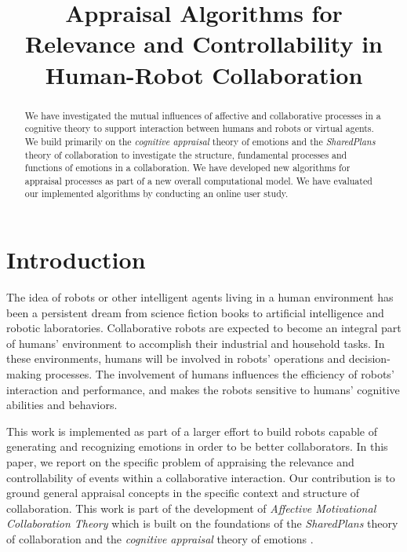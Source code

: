 \documentclass{article}
\title{Appraisal Algorithms for Relevance and Controllability in\\
Human-Robot Collaboration}
\begin{document}
\maketitle

\begin{abstract}
\vspace*{-1mm}
We have investigated the mutual influences of affective and collaborative
processes in a cognitive theory to support interaction between humans and robots
or virtual agents. We build primarily on the \textit{cognitive appraisal} theory of
emotions and the \textit{SharedPlans} theory of collaboration to investigate the
structure, fundamental processes and functions of emotions in a collaboration.
We have developed new algorithms for appraisal processes as part of a new
overall computational model. We have evaluated our implemented algorithms by
conducting an online user study.
\end{abstract}

\vspace*{-3mm}
\section{Introduction}
The idea of robots or other intelligent agents living in a human environment has
been a persistent dream from science fiction books to artificial intelligence
and robotic laboratories. Collaborative robots are expected to become an
integral part of humans' environment to accomplish their industrial and
household tasks. In these environments, humans will be involved in robots'
operations and decision-making processes. The involvement of humans influences
the efficiency of robots' interaction and performance, and makes the robots
sensitive to humans' cognitive abilities and behaviors.

This work is implemented as part of a larger effort to build robots capable of
generating and recognizing emotions in order to be better collaborators. In this
paper, we report on the specific problem of appraising the relevance and
controllability of events within a collaborative interaction. Our contribution
is to ground general appraisal concepts in the specific context and structure of
collaboration. This work is part of the development of \textit{Affective
Motivational Collaboration Theory} which is built on the foundations of the
\textit{SharedPlans} theory of collaboration \cite{grosz:plans-discourse} and
the \textit{cognitive appraisal} theory of emotions
\cite{gratch:domain-independent}.
\end{document}
